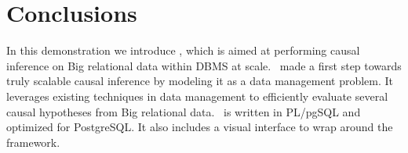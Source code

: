 \vspace{-.2cm}
\section{Conclusions}
In this demonstration we introduce \GSQL, which is aimed at
performing causal inference
on Big relational data within DBMS at scale. \GSQL\ made a first step towards truly scalable causal inference by modeling it as a data management problem. It leverages existing techniques
in data management to efficiently evaluate several causal hypotheses from Big relational data. \GSQL\ is written in PL/pgSQL and optimized for PostgreSQL. It also includes a visual interface to wrap around the framework.

